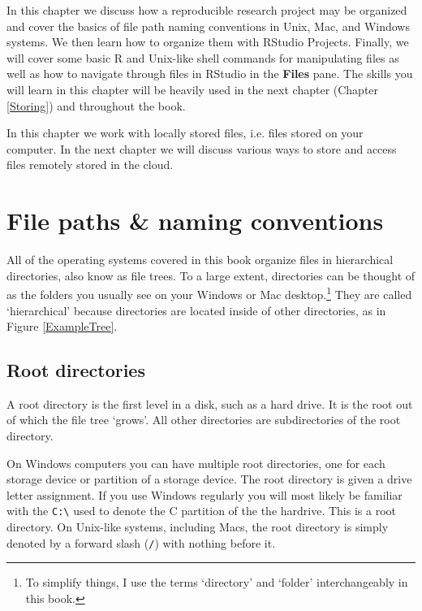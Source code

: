 \documentclass[krantz1]{krantz}
\begin{document}
In this chapter we discuss how a reproducible research project may be organized and cover the basics of file path naming conventions in Unix, Mac, and Windows systems. We then learn how to organize them with RStudio Projects. Finally, we will cover some basic R and Unix-like shell commands for manipulating files as well as how to navigate through files in RStudio in the {\bf{Files}} pane. The skills you will learn in this chapter will be heavily used in the next chapter (Chapter \ref{Storing}) and throughout the book.

In this chapter we work with locally stored files, i.e. files stored on your computer. In the next chapter we will discuss various ways to store and access files remotely stored in the cloud.


\section{File paths \& naming conventions}

All of the operating systems covered in this book organize files in hierarchical directories, also know as file trees. To a large extent, directories can be thought of as the folders you usually see on your Windows or Mac desktop.\footnote{To simplify things, I use the terms `directory' and `folder' interchangeably in this book.} They are called `hierarchical' because directories are located inside of other directories, as in Figure \ref{ExampleTree}. 

\subsection{Root directories}

A root directory is the first level in a disk, such as a hard drive. It is the root out of which the file tree `grows'. All other directories are subdirectories of the root directory.

On Windows computers you can have multiple root directories, one for each storage device or partition of a storage device. The root directory is given a drive letter assignment. If you use Windows regularly you will most likely be familiar with the \texttt{C:\textbackslash{}} used to denote the C partition of the the hardrive. This is a root directory. On Unix-like systems, including Macs, the root directory is simply denoted by a forward slash (\texttt{/}) with nothing before it.
\end{document}
